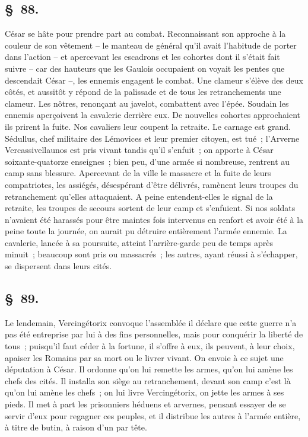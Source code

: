 \documentclass[french,twoside]{book} %
\begin{document}
\subsection[{§ 88.}]{ \textsc{§ 88.} }
\noindent César se hâte pour prendre part au combat. Reconnaissant son approche à la couleur de son vêtement – le manteau de général qu’il avait l’habitude de porter dans l’action – et apercevant les escadrons et les cohortes dont il s’était fait suivre – car des hauteurs que les Gaulois occupaient on voyait les pentes que descendait César –, les ennemis engagent le combat. Une clameur s’élève des deux côtés, et aussitôt y répond de la palissade et de tous les retranchements une clameur. Les nôtres, renonçant au javelot, combattent avec l’épée. Soudain les ennemis aperçoivent la cavalerie derrière eux. De nouvelles cohortes approchaient ils prirent la fuite. Nos cavaliers leur coupent la retraite. Le carnage est grand. Sédullus, chef militaire des Lémovices et leur premier citoyen, est tué ; l’Arverne Vercassivellaunos est pris vivant tandis qu’il s’enfuit ; on apporte à César soixante-quatorze enseignes ; bien peu, d’une armée si nombreuse, rentrent au camp sans blessure. Apercevant de la ville le massacre et la fuite de leurs compatriotes, les assiégés, désespérant d’être délivrés, ramènent leurs troupes du retranchement qu’elles attaquaient. A peine entendent-elles le signal de la retraite, les troupes de secours sortent de leur camp et s’enfuient. Si nos soldats n’avaient été harassés pour être maintes fois intervenus en renfort et avoir été à la peine toute la journée, on aurait pu détruire entièrement l’armée ennemie. La cavalerie, lancée à sa poursuite, atteint l’arrière-garde peu de temps après minuit ; beaucoup sont pris ou massacrés ; les autres, ayant réussi à s’échapper, se dispersent dans leurs cités.
\subsection[{§ 89.}]{ \textsc{§ 89.} }
\noindent Le lendemain, Vercingétorix convoque l’assemblée il déclare que cette guerre n’a pas été entreprise par lui à des fins personnelles, mais pour conquérir la liberté de tous ; puisqu’il faut céder à la fortune, il s’offre à eux, ils peuvent, à leur choix, apaiser les Romains par sa mort ou le livrer vivant. On envoie à ce sujet une députation à César. Il ordonne qu’on lui remette les armes, qu’on lui amène les chefs des cités. Il installa son siège au retranchement, devant son camp c’est là qu’on lui amène les chefs ; on lui livre Vercingétorix, on jette les armes à ses pieds. Il met à part les prisonniers héduens et arvernes, pensant essayer de se servir d’eux pour regagner ces peuples, et il distribue les autres à l’armée entière, à titre de butin, à raison d’un par tête.
\end{document}
